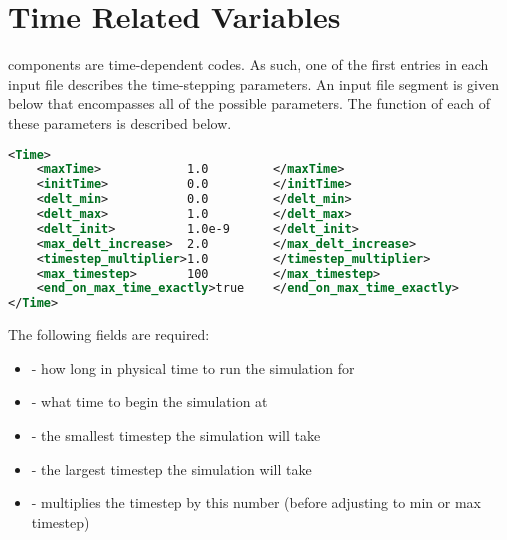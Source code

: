 \section{Time Related Variables} \label{Sec:TimeRelatedVariables}
\Vaango components are time-dependent codes.  As such, one of the first
entries in each input file describes the time-stepping parameters.  An
input file segment is given below that encompasses all of the possible
parameters.  The function of each of these parameters is described below.

\begin{lstlisting}[language=XML]
<Time>
    <maxTime>            1.0         </maxTime>
    <initTime>           0.0         </initTime>
    <delt_min>           0.0         </delt_min>
    <delt_max>           1.0         </delt_max>
    <delt_init>          1.0e-9      </delt_init>
    <max_delt_increase>  2.0         </max_delt_increase>
    <timestep_multiplier>1.0         </timestep_multiplier>
    <max_timestep>       100         </max_timestep>
    <end_on_max_time_exactly>true    </end_on_max_time_exactly>
</Time>
\end{lstlisting}

The following fields are required:
\begin{itemize}
\item {} - how long in physical time to run the simulation for
\item {} - what time to begin the simulation at
\item {} - the smallest timestep the simulation will take
\item {} - the largest timestep the simulation will take
\item {} - multiplies the timestep by this number (before adjusting to min or max timestep)
\end{itemize}

